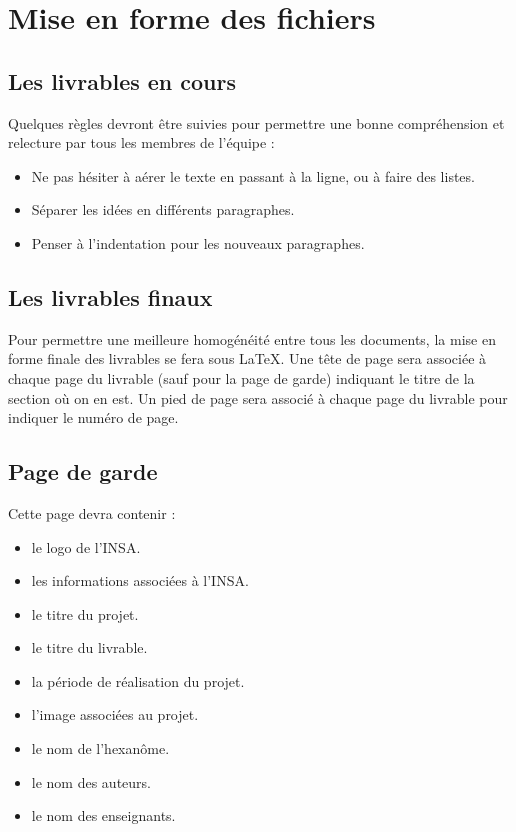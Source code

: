 \section{Mise en forme des fichiers}
\subsection{Les livrables en cours}

    Quelques règles devront être suivies pour permettre une bonne compréhension et relecture par tous les membres de l'équipe  :
\begin{itemize}
    \item Ne pas hésiter à  aérer le texte en passant à  la ligne, ou à  faire des listes.
    \item Séparer les idées en différents paragraphes.
    \item Penser à  l'indentation pour les nouveaux paragraphes.
\end{itemize}

\subsection{Les livrables finaux}
    Pour permettre une meilleure homogénéité entre tous les documents, la mise en forme finale des livrables se fera sous LaTeX. Une tête de page sera associée à  chaque page du livrable (sauf pour la page de garde) indiquant le titre de la section où on en est. Un pied de page sera associé à  chaque page du livrable pour indiquer le numéro de page.


\subsection{Page de garde}
Cette page devra contenir  :
\begin{itemize}
    \item le logo de l'INSA.
    \item les informations associées à l'INSA.
    \item le titre du projet.
    \item le titre du livrable.
    \item la période de réalisation du projet.
    \item l'image associées au projet.
    \item le nom de l'hexanôme.
    \item le nom des auteurs.
    \item le nom des enseignants.
\end{itemize}

